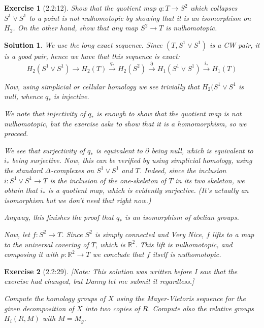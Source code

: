 \documentclass{article}
\theoremstyle{plain}
\newtheorem*{ex}{Exercise}
\theoremstyle{nonumberplain}
\newtheorem{sol}{Solution}
\newcommand{\R}{\mathbb{R}}
\begin{document}
\begin{ex}[2.2:12]
Show that the quotient map $q \colon T \to S^2$ which collapses $S^1 \vee S^1$ to a point is not nulhomotopic by showing that it is an isomorphism on $H_2$. On the other hand, show that any map $S^2  \to T$ is nulhomotopic.
\end{ex}

\begin{sol}
We use the long exact sequence. Since $(T,S^1 \vee S^1)$ is a CW pair, it is a good pair, hence we have that this sequence is exact:
\begin{equation}
H_2(S^1 \vee S^1) \to H_2(T) \xrightarrow{q_*} H_2(S^2) \xrightarrow{\partial} H_1(S^1 \vee S^1) \xrightarrow{i_*} H_1(T)
\end{equation}

Now, using simplicial or cellular homology we see trivially that $H_2(S^1 \vee S^1$ is null, whence $q_*$ is injective.

We note that injectivity of $q_*$ is enough to show that the quotient map is not nulhomotopic, but the exercise asks to show that it is a homomorphism, so we proceed.

We see that surjectivity of $q_*$ is equivalent to $\partial$ being null, which is equivalent to $i_*$ being surjective. Now, this can be verified by using simplicial homology, using the standard $\Delta$-complexes on $S^1 \vee S^1$ and $T$. Indeed, since the inclusion $i \colon S^1 \vee S^1 \to T$ is the inclusion of the one-skeleton of $T$ in its two skeleton, we obtain that $i_*$ is a quotient map, which is evidently surjective. (It's actually an isomorphism but we don't need that right now.)

Anyway, this finishes the proof that $q_*$ is an isomorphism of abelian groups.

\medskip

Now, let $f \colon S^2 \to T$. Since $S^2$ is simply connected and Very Nice, $f$ lifts to a map to the universal covering of $T$, which is $\R^2$. This lift is nulhomotopic, and composing it with $p \colon \R^2 \to T$ we conclude that $f$ itself is nulhomotopic.
\end{sol}

\begin{ex}[2.2:29]
[Note: This solution was written before I saw that the exercise had changed, but Danny let me submit it regardless.]

Compute the homology groups of $X$ using the Mayer-Vietoris sequence for the given decomposition of $X$ into two copies of $R$. Compute also the relative groups $H_i(R,M)$ with $M = M_g$.
\end{ex}
\end{document}
